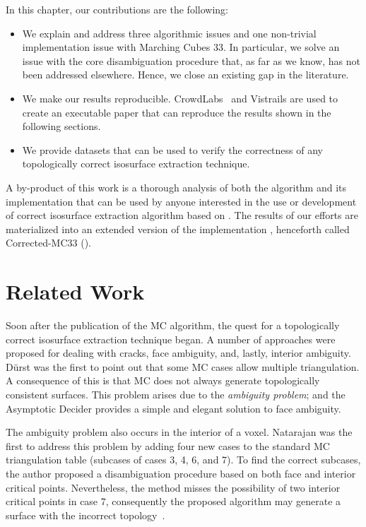 In this chapter, our contributions are the following:
\begin{itemize}
\item We explain and address three algorithmic issues and one non-trivial implementation issue with Marching Cubes 33. In particular, we solve an issue with the core \mc{} disambiguation procedure that, as far as we know, has not been addressed elsewhere. Hence, we close an existing gap in the \mc{} literature.
\item We make our results reproducible. CrowdLabs~\cite{Tohline:2010jn} and Vistrails \cite{Freire:2006va} are used to create an executable paper that can reproduce the results shown in the following sections.
\item We provide datasets that  can be used to verify the correctness of any topologically correct isosurface extraction technique.
\end{itemize}
A by-product of this work is a thorough analysis of both the \mc{} algorithm and its implementation that can be used by anyone interested in  the use or development of correct isosurface extraction algorithm based on \mc{}. The results of our efforts are materialized into an extended version of the \mc{} implementation \cite{lewiner:impl}, henceforth called Corrected-MC33 (\cmc).




\section{Related Work}
\label{related_work1}

Soon after the publication of the MC algorithm, the quest for a topologically correct isosurface extraction technique began. A number of approaches were proposed for dealing with cracks, face ambiguity, and, lastly, interior ambiguity.
%
D\"urst \cite{Durst88} was the first to point out that some MC cases allow multiple triangulation. A consequence of this is that MC does not always generate topologically consistent surfaces. This problem arises due to the \emph{ambiguity problem}; and
the Asymptotic Decider \cite{Nielson:1991:ADR:949607.949621} provides a simple and elegant solution to face ambiguity.

The ambiguity problem also occurs in the interior of a voxel. Natarajan \cite{Natarajan:1994:GTC:205424.205429}  was the first to address this problem by adding four new cases to the standard MC triangulation table (subcases of cases 3, 4, 6, and 7). To find the correct subcases, the author proposed a disambiguation procedure based on both face and interior critical points. Nevertheless,  the method misses the possibility of two interior critical points in case 7, consequently the proposed algorithm may generate a surface with the incorrect topology~\cite{10.1109/TVCG.2009.10,newman:candg:2006}.

